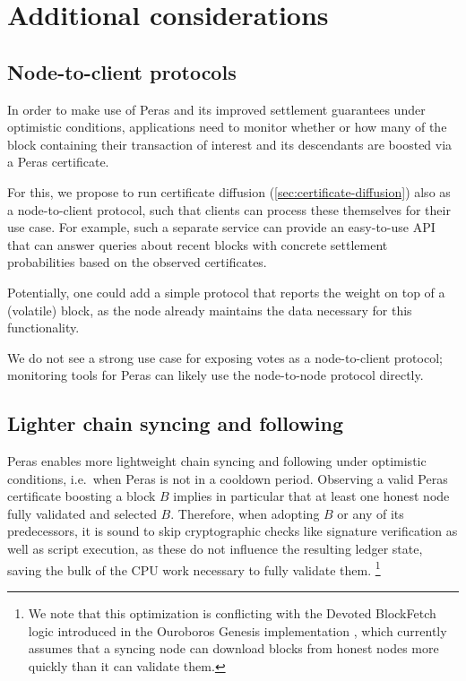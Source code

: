 \section{Additional considerations}

\subsection{Node-to-client protocols}

In order to make use of Peras and its improved settlement guarantees under optimistic conditions, applications need to monitor whether or how many of the block containing their transaction of interest and its descendants are boosted via a Peras certificate.

For this, we propose to run certificate diffusion (\cref{sec:certificate-diffusion}) also as a node-to-client protocol, such that clients can process these themselves for their use case.
For example, such a separate service can provide an easy-to-use API that can answer queries about recent blocks with concrete settlement probabilities based on the observed certificates.

Potentially, one could add a simple protocol that reports the weight on top of a (volatile) block, as the node already maintains the data necessary for this functionality.

We do not see a strong use case for exposing votes as a node-to-client protocol; monitoring tools for Peras can likely use the node-to-node protocol directly.

\subsection{Lighter chain syncing and following}\label{sec:lighter chain syncing following}

Peras enables more lightweight chain syncing and following under optimistic conditions, i.e.\ when Peras is not in a cooldown period.
Observing a valid Peras certificate boosting a block $B$ implies in particular that at least one honest node fully validated and selected $B$.
Therefore, when adopting $B$ or any of its predecessors, it is sound to skip cryptographic checks like signature verification as well as script execution, as these do not influence the resulting ledger state, saving the bulk of the CPU work necessary to fully validate them.%
\footnote{We note that this optimization is conflicting with the Devoted BlockFetch logic introduced in the Ouroboros Genesis implementation \parencite{genesis-implementation-documentation}, which currently assumes that a syncing node can download blocks from honest nodes more quickly than it can validate them.}

